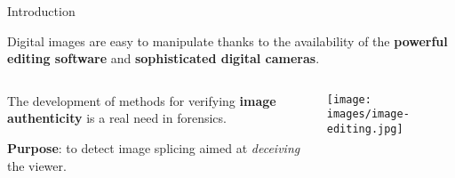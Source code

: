 
\begin{tframe}{Introduction}

\vspace{0.5cm}
Digital images are easy to manipulate thanks to the availability of the \textbf{powerful editing software} and \textbf{sophisticated digital cameras}.

\vspace{1cm}


\begin{minipage}{\textwidth}
\begin{columns}[T]
\begin{column}{0.5\textwidth}
\vspace{0.1cm}
The development of methods for verifying \textbf{image authenticity} is a real need in forensics.

\vspace{0.8cm}
\textbf{Purpose}: to detect image splicing  aimed at \emph{deceiving} the viewer.
\end{column}
\begin{column}{0.4\textwidth}
\texttt{[image: images/image-editing.jpg]}
\end{column}
\end{columns}
\end{minipage}

\end{tframe}